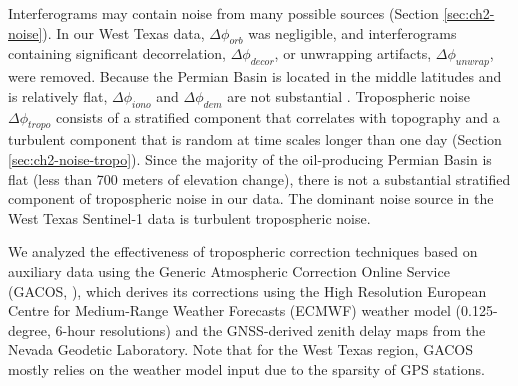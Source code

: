 Interferograms may contain noise from many possible sources (Section \ref{sec:ch2-noise}). %
In our West Texas data, $\Delta \phi_{orb}$ was negligible, and interferograms containing significant decorrelation, $\Delta \phi_{decor}$, or unwrapping artifacts, $\Delta \phi_{unwrap}$, were removed. Because the Permian Basin is located in the middle latitudes and is relatively flat, $\Delta \phi_{iono}$ and $\Delta \phi_{dem}$  are not substantial \citep{Fattahi2013DemErrorCorrection, Liang2019IonosphericCorrectionInsar}. 
Tropospheric noise $\Delta \phi_{tropo}$ consists of a stratified component that correlates with topography \citep{Doin2009CorrectionsStratifiedTropospheric} and a turbulent component that is random at time scales longer than one day \citep{Emardson2003NeutralAtmosphericDelay} (Section \ref{sec:ch2-noise-tropo}).
Since the majority of the oil-producing Permian Basin is flat (less than 700 meters of elevation change), there is not a substantial stratified component of tropospheric noise in our data. 
The dominant noise source in the West Texas Sentinel-1 data is turbulent tropospheric noise.





We analyzed the effectiveness of tropospheric correction techniques based on auxiliary data using the Generic Atmospheric Correction Online Service (GACOS, \citep{Yu2018InterferometricSyntheticAperture,Yu2018GenericAtmosphericCorrection}), 
which derives its corrections using the High Resolution European Centre for Medium-Range Weather Forecasts (ECMWF) weather model (0.125-degree, 6-hour resolutions) and the GNSS-derived zenith delay maps from the Nevada Geodetic Laboratory.
Note that for the West Texas region, GACOS mostly relies on the weather model input due to the sparsity of GPS stations.



